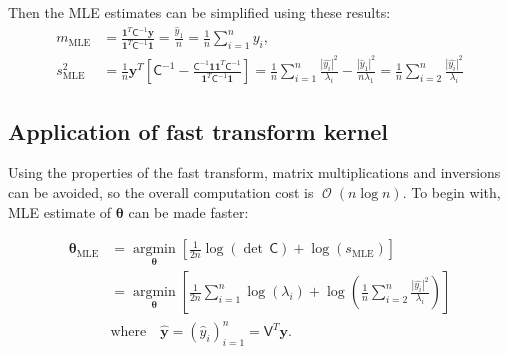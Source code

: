 \documentclass[smallextended]{svjour3}       %
\DeclareMathOperator{\Order}{{\mathcal O}}
\newcommand{\bm}[1]{\boldsymbol{#1}}
\newcommand{\vtheta}{{\bm{\theta}}}
\newcommand{\vthetaMLE}{\bm{\theta}_{\text{MLE}}}
\newcommand{\vC}{\bm{C}}
\newcommand{\vy}{\bm{y}}
\newcommand{\vone}{\bm{1}}
\newcommand{\mC}{\mathsf{C}}
\newcommand{\mCInv}{{\mathsf{C}^{-1}}}
\newcommand{\mV}{\mathsf{V}}
\newcommand{\hmu}{\hat{\mu}}
\newcommand{\MLE}{\text{MLE}}
\def\abs#1{\ensuremath{\left \lvert #1 \right \rvert}}
\providecommand{\argmin}{\operatorname*{argmin}}
\begin{document}
Then the MLE estimates can be simplified using these results:
\begin{align*}
m_\MLE &= \frac{\vone^T\mCInv\vy}{\vone^T\mCInv\vone} = \frac{\widehat{y}_1}{n} = \frac 1n \sum_{i=1}^n y_i,
\\
s^2_\MLE &= \frac 1n \vy^T \left[ \mCInv - \frac{\mCInv \vone \vone^T \mCInv}{\vone^T\mCInv\vone}\right]
=
\frac 1n \sum_{i=1}^n \frac{\abs{\widehat{y_i}}^2}{\lambda_i} - \frac{\abs{\widehat{y}_1}^2}{n \lambda_1} = 
\frac 1n \sum_{i=2}^n \frac{\abs{\widehat{y_i}}^2}{\lambda_i}
\end{align*}



















\subsection{Application of fast transform kernel}
Using the properties of the fast transform, matrix multiplications and inversions can be avoided, so the overall computation cost is $\Order(n \log n )$.
To begin with, MLE estimate of $\vtheta$ can be made faster:




\begin{align}
\nonumber
\vtheta_\MLE
&= 
\argmin_{\vtheta}
\left[
 \frac{1}{2n} \log(\det\, \mC) + 
 \log\left(s_\MLE \right) 
\right]
\\
\label{eqn_MLE_loss_func_optimized_2}
&= 
\argmin_{\vtheta}
\left[
 \frac{1}{2n}\sum_{i=1}^n \log(\lambda_i) + 
 \log\left(
 \frac 1n \sum_{i=2}^n \frac{\abs{\widehat{y_i}}^2}{\lambda_i}
 \right) 
\right]
\\
\nonumber
&\text{where} \quad 
\hat{\vy} = (\hat{y}_i)_{i=1}^{n} = \mV^T \vy.
\end{align}
\end{document}
